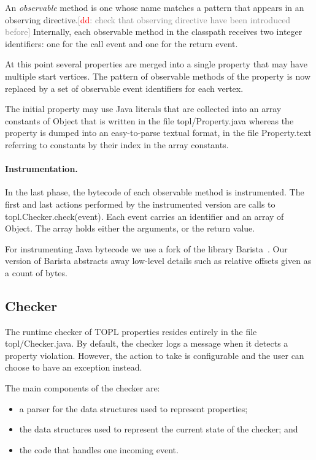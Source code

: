 \documentclass{sigplanconf}[10pt] %
\newcommand{\noterg}[2]{\textcolor{gray}{[\textcolor{red}{#1}: #2]}}
\newcommand{\dd}[1]{\noterg{dd}{#1}}
\newcommand{\dinocomment}[1]{\dd{#1}}
\begin{document}
An \emph{observable} method is one whose name matches a pattern that appears in an \textsf{observing} directive.\dinocomment{check that observing directive have been introduced before}
Internally, each observable method in the classpath receives two integer identifiers: one for the call event and one for the return event.

At this point several properties are merged into a single property that may have multiple start vertices.
The pattern of observable methods of the property is now replaced by 
a set of observable event identifiers for each vertex.

The initial property may use Java literals that are collected into an array \textsf{constants} of \textsf{Object} that is written in the file \textsf{topl/Property.java}  whereas the property is dumped into an easy-to-parse textual format, in the file \textsf{Property.text}
referring to constants by their index in the array \textsf{constants}.

\paragraph{Instrumentation.} In the last phase, 
the bytecode of each observable method is instrumented.
The first and last actions performed by the instrumented version are calls to {\sf topl.Checker.check(event)}.
Each \textsf{event} carries an identifier and an array of \textsf{Object}.
The array holds either the arguments, or the return value.

For instrumenting Java bytecode we use a fork of the library Barista~\cite{cite-barista}.
Our version of Barista abstracts away low-level details such as relative offsets given as a count of bytes.

\subsection{Checker} %

The runtime checker of TOPL properties resides entirely in the file {\sf topl/Checker.java}.
By default, the checker logs a message when it detects a property violation. However, the action to take is configurable and the user can choose to have an exception instead.

The main components of the checker are:
\begin{itemize}
\item a parser for the data structures used to represent properties;
\item the data structures used to represent the current state of the checker; and
\item the code that handles one incoming event.
\end{itemize}
\end{document}
